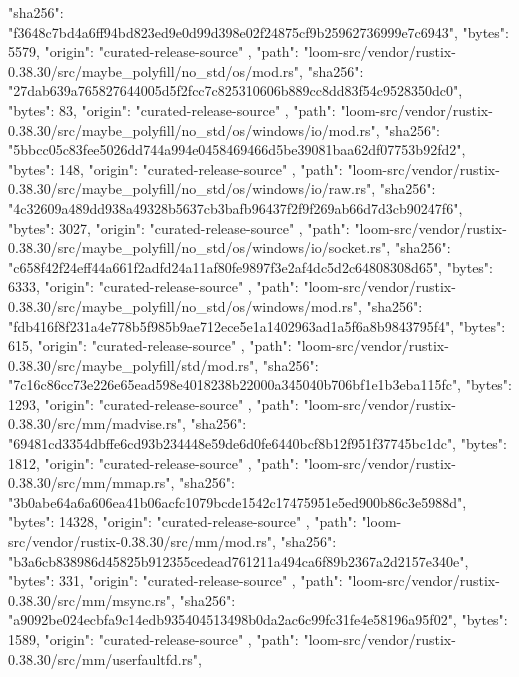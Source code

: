 {{      "sha256": "f3648c7bd4a6ff94bd823ed9e0d99d398e02f24875cf9b25962736999e7c6943",
      "bytes": 5579,
      "origin": "curated-release-source"
    },
    {
      "path": "loom-src/vendor/rustix-0.38.30/src/maybe_polyfill/no_std/os/mod.rs",
      "sha256": "27dab639a765827644005d5f2fcc7c825310606b889cc8dd83f54c9528350dc0",
      "bytes": 83,
      "origin": "curated-release-source"
    },
    {
      "path": "loom-src/vendor/rustix-0.38.30/src/maybe_polyfill/no_std/os/windows/io/mod.rs",
      "sha256": "5bbcc05c83fee5026dd744a994e0458469466d5be39081baa62df07753b92fd2",
      "bytes": 148,
      "origin": "curated-release-source"
    },
    {
      "path": "loom-src/vendor/rustix-0.38.30/src/maybe_polyfill/no_std/os/windows/io/raw.rs",
      "sha256": "4c32609a489dd938a49328b5637cb3bafb96437f2f9f269ab66d7d3cb90247f6",
      "bytes": 3027,
      "origin": "curated-release-source"
    },
    {
      "path": "loom-src/vendor/rustix-0.38.30/src/maybe_polyfill/no_std/os/windows/io/socket.rs",
      "sha256": "c658f42f24eff44a661f2adfd24a11af80fe9897f3e2af4dc5d2c64808308d65",
      "bytes": 6333,
      "origin": "curated-release-source"
    },
    {
      "path": "loom-src/vendor/rustix-0.38.30/src/maybe_polyfill/no_std/os/windows/mod.rs",
      "sha256": "fdb416f8f231a4e778b5f985b9ae712ece5e1a1402963ad1a5f6a8b9843795f4",
      "bytes": 615,
      "origin": "curated-release-source"
    },
    {
      "path": "loom-src/vendor/rustix-0.38.30/src/maybe_polyfill/std/mod.rs",
      "sha256": "7c16c86cc73e226e65ead598e4018238b22000a345040b706bf1e1b3eba115fc",
      "bytes": 1293,
      "origin": "curated-release-source"
    },
    {
      "path": "loom-src/vendor/rustix-0.38.30/src/mm/madvise.rs",
      "sha256": "69481cd3354dbffe6cd93b234448e59de6d0fe6440bcf8b12f951f37745bc1dc",
      "bytes": 1812,
      "origin": "curated-release-source"
    },
    {
      "path": "loom-src/vendor/rustix-0.38.30/src/mm/mmap.rs",
      "sha256": "3b0abe64a6a606ea41b06acfc1079bcde1542c17475951e5ed900b86c3e5988d",
      "bytes": 14328,
      "origin": "curated-release-source"
    },
    {
      "path": "loom-src/vendor/rustix-0.38.30/src/mm/mod.rs",
      "sha256": "b3a6cb838986d45825b912355cedead761211a494ca6f89b2367a2d2157e340e",
      "bytes": 331,
      "origin": "curated-release-source"
    },
    {
      "path": "loom-src/vendor/rustix-0.38.30/src/mm/msync.rs",
      "sha256": "a9092be024ecbfa9c14edb935404513498b0da2ac6c99fc31fe4e58196a95f02",
      "bytes": 1589,
      "origin": "curated-release-source"
    },
    {
      "path": "loom-src/vendor/rustix-0.38.30/src/mm/userfaultfd.rs",
}}
